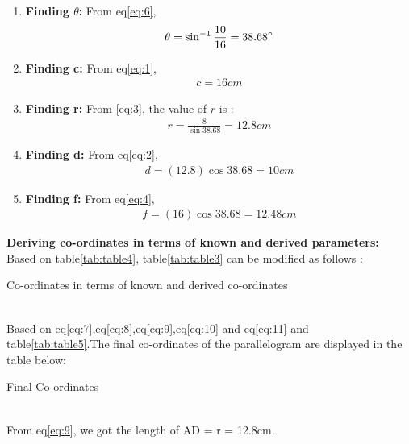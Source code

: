 \documentclass{article}
\begin{document}
\begin{enumerate}
	\item \textbf{Finding $\theta$:}
		From eq\ref{eq:6},
		\begin{align}
			\theta = \sin^{-1}\frac{10}{16} = 38.68\degree
			\label{eq:7}
		\end{align}
	\item \textbf{Finding c:}
		From eq\ref{eq:1},
		\begin{align}
			c = 16cm
			\label{eq:8}
		\end{align}
	\item \textbf{Finding r:}
		From \ref{eq:3}, the value of $r$ is :
		\begin{align}
			r = \frac{8}{\sin{38.68}} = 12.8cm
			\label{eq:9}
		\end{align}
	\item \textbf{Finding d:}
		From eq\ref{eq:2},
		\begin{align}
			d = (12.8)\cos{38.68} = 10cm
			\label{eq:10}
		\end{align}
	\item \textbf{Finding f:}
		From eq\ref{eq:4},
		\begin{align}
			f = (16)\cos{38.68} = 12.48cm
			\label{eq:11}
		\end{align}
\end{enumerate}
\textbf{Deriving co-ordinates in terms of known and derived parameters:}\\
Based on table\ref{tab:table4}, table\ref{tab:table3} can be modified as follows :\\
\begin{table}[H]
	\centering
	
	\caption{Co-ordinates in terms of known and derived co-ordinates}
	\label{tab:table5}
\end{table}\\
Based on eq\ref{eq:7},eq\ref{eq:8},eq\ref{eq:9},eq\ref{eq:10} and eq\ref{eq:11} and table\ref{tab:table5}.The final co-ordinates of the  parallelogram are displayed in the table below:\\
\begin{table}[H]
	\centering
	
	\caption{Final Co-ordinates}
	\label{tab:table6}
\end{table}\\
From eq\ref{eq:9}, we got the length of AD = r = 12.8cm.
\end{document}
